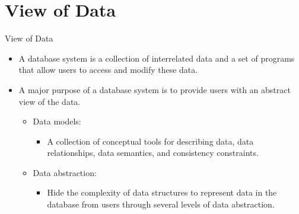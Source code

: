 \documentclass{beamer}
\begin{document}
\section{View of Data}

\begin{frame}{View of Data}
    \begin{itemize}
        \item A database system is a collection of interrelated data and a set of programs that allow users to access and modify these data. 
        \item A major purpose of a database system is to provide users with an abstract view of the data.
        \begin{itemize}
            \item Data models:
            \begin{itemize}
                \item A collection of conceptual tools for describing data, data relationships, data semantics, and consistency constraints.
            \end{itemize}
            \item Data abstraction:
            \begin{itemize}
                \item Hide the complexity  of data structures to represent data in the database from users through several levels of data abstraction.
            \end{itemize}
        \end{itemize}
    \end{itemize}
\end{frame}
\end{document}
